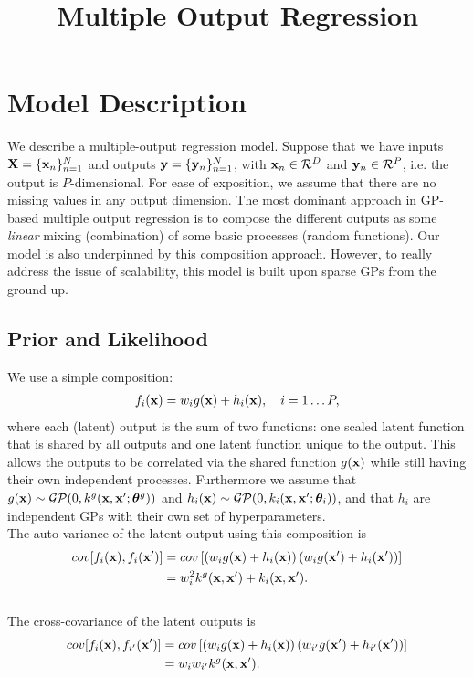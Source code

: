 \documentclass{article} %
\title{Multiple Output Regression}
\begin{document}
\maketitle
\linenumbers

\section{Model Description}
We describe a multiple-output regression model.
Suppose that we have inputs $\mathbf{X} = \{\mathbf{x}_n\}_{n=1}^N$ and outputs $\mathbf{y} = \{\mathbf{y}_n\}_{n=1}^N$, with $\mathbf{x}_n \in \mathcal{R}^D$ and $\mathbf{y}_n \in \mathcal{R}^P$, i.e. the output is $P$-dimensional.
For ease of exposition, we assume that there are no missing values in any output dimension.
The most dominant approach in GP-based multiple output regression is to compose the different outputs as some \textit{linear} mixing (combination) of some basic processes (random functions).
Our model is also underpinned by this composition approach.
However, to really address the issue of scalability, this model is built upon sparse GPs from the ground up.


\subsection{Prior and Likelihood}
We use a simple composition:
\begin{align}
f_i(\mathbf{x}) = w_i g(\mathbf{x}) + h_i(\mathbf{x}), \quad i = 1 \hdots P,
\end{align}
where each (latent) output is the sum of two functions: one scaled latent function that is shared by all outputs and one latent function unique to the output.
This allows the outputs to be correlated via the shared function $g(\mathbf{x})$ while still having their own independent processes.
Furthermore we assume that $g(\mathbf{x}) \sim \mathcal{GP}(0, k^g(\mathbf{x},\mathbf{x}'; \boldsymbol{ \theta }^g))$ and $h_i(\mathbf{x}) \sim \mathcal{GP}(0, k_i(\mathbf{x},\mathbf{x}'; \boldsymbol{ \theta }_i))$, and that $h_i$ are independent GPs with their own set of hyperparameters. \\

\noindent The auto-variance of the latent output using this composition is
\begin{align}
\nonumber
cov[f_i(\mathbf{x}), f_i(\mathbf{x}')] 
&= cov \left[ \left(w_i g(\mathbf{x}) + h_i(\mathbf{x}) \right) \left(w_{i} g(\mathbf{x}') + h_i(\mathbf{x}') \right) \right] \\
&= w_i^2 k^g(\mathbf{x}, \mathbf{x}') + k_i(\mathbf{x},\mathbf{x}').
\end{align}
\\
\noindent The cross-covariance of the latent outputs is
\begin{align}
\nonumber
cov[f_i(\mathbf{x}), f_{i'}(\mathbf{x}')] 
&= cov \left[ \left(w_i g(\mathbf{x}) + h_i(\mathbf{x}) \right) \left(w_{i'} g(\mathbf{x}') + h_{i'}(\mathbf{x}') \right) \right] \\
&= w_i w_{i'} k^g(\mathbf{x}, \mathbf{x}').
\end{align} 
\end{document}
